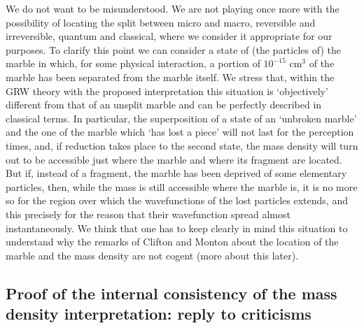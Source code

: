 \documentclass[12pt]{article}
\begin{document}
We do not want to be misunderstood. We are not playing once more
with the possibility of locating the split between micro and
macro, reversible and irreversible, quantum and classical, where
we consider it appropriate for our purposes. To clarify this point
we can consider a state of (the particles of) the marble in which,
for some physical interaction, a portion of $10^{-15}$ cm$^{3}$ of
the marble has been separated from the marble itself. We stress
that, within the GRW theory with the proposed interpretation this
situation is `objectively' different from that of an unsplit
marble and can be perfectly described in classical terms. In
particular, the superposition of a state of an `unbroken marble'
and the one of the marble which `has lost a piece' will not last
for the perception times, and, if reduction takes place to the
second state, the mass density will turn out to be accessible just
where the marble and where its fragment are located. But if,
instead of a fragment, the marble has been deprived of some
elementary particles, then, while the mass is still accessible
where the marble is, it is no more so for the region over which
the wavefunctions of the lost particles extends, and this
precisely for the reason that their wavefunction spread almost
instantaneously. We think that one has to keep clearly in mind
this situation  to understand why  the remarks of Clifton and
Monton about the location of the marble and the mass density are
not cogent (more about this later).

\subsection[Reply to criticisms]{Proof of the internal consistency of
the mass density interpretation: reply to criticisms}
\label{sec135}
\end{document}
